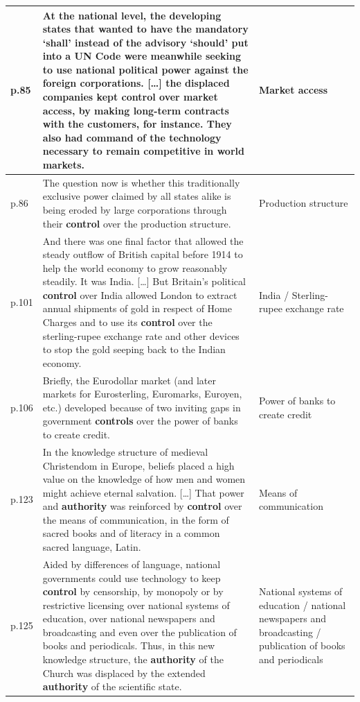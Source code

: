\begin{longtable}{p{1.2cm} p{9.5cm} p{3.2cm}}
p.85 & At the national level, the developing states that wanted to have the mandatory `shall' instead of the advisory `should' put into a UN Code were meanwhile seeking to use national political power against the foreign corporations. {[}\ldots{]} the displaced companies kept \textbf{control} over market access, by making long-term contracts with the customers, for instance. They also had command of the technology necessary to remain competitive in world markets. & Market access \\
\midrule

p.86 & The question now is whether this traditionally exclusive power claimed by all states alike is being eroded by large corporations through their \textbf{control} over the production structure. & Production structure \\
\midrule

p.101 & And there was one final factor that allowed the steady outflow of British capital before 1914 to help the world economy to grow reasonably steadily. It was India. {[}\ldots{]} But Britain's political \textbf{control} over India allowed London to extract annual shipments of gold in respect of Home Charges and to use its \textbf{control} over the sterling-rupee exchange rate and other devices to stop the gold seeping back to the Indian economy. & India / Sterling-rupee exchange rate \\
\midrule

p.106 & Briefly, the Eurodollar market (and later markets for Eurosterling, Euromarks, Euroyen, etc.) developed because of two inviting gaps in government \textbf{controls} over the power of banks to create credit. & Power of banks to create credit \\
\midrule

p.123 & In the knowledge structure of medieval Christendom in Europe, beliefs placed a high value on the knowledge of how men and women might achieve eternal salvation. {[}\ldots{]} That power and \textbf{authority} was reinforced by \textbf{control} over the means of communication, in the form of sacred books and of literacy in a common sacred language, Latin. & Means of communication \\
\midrule

p.125 & Aided by differences of language, national governments could use technology to keep \textbf{control} by censorship, by monopoly or by restrictive licensing over national systems of education, over national newspapers and broadcasting and even over the publication of books and periodicals. Thus, in this new knowledge structure, the \textbf{authority} of the Church was displaced by the extended \textbf{authority} of the scientific state. & National systems of education / national newspapers and broadcasting / publication of books and periodicals \\
\midrule


\end{longtable}
